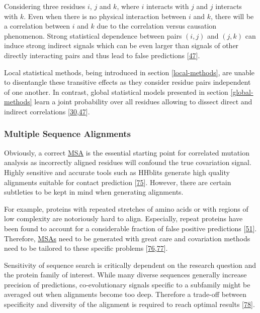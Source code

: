 \documentclass[12pt,a4paper,twoside]{book}
\theoremstyle{definition}
\theoremstyle{definition}
\theoremstyle{remark}
\begin{document}
Considering three residues \(i\), \(j\) and \(k\), where \(i\) interacts
with \(j\) and \(j\) interacts with \(k\). Even when there is no
physical interaction between \(i\) and \(k\), there will be a
correlation between \(i\) and \(k\) due to the correlation versus
causation phenomenon. Strong statistical dependence between pairs
\((i,j)\) and \((j,k)\) can induce strong indirect signals which can be
even larger than signals of other directly interacting pairs and thus
lead to false predictions {[}\protect\hyperlink{ref-Burger2010}{47}{]}.

Local statistical methods, being introduced in section
\ref{local-methods}, are unable to disentangle these transitive effects
as they consider residue pairs independent of one another. In contrast,
global statistical models presented in section \ref{global-methods}
learn a joint probability over all residues allowing to dissect direct
and indirect correlations
{[}\protect\hyperlink{ref-Weigt2009}{30},\protect\hyperlink{ref-Burger2010}{47}{]}.

\subsubsection*{Multiple Sequence
Alignments}\label{multiple-sequence-alignments}

Obviously, a correct \protect\hyperlink{abbrev}{MSA} is the essential
starting point for correlated mutation analysis as incorrectly aligned
residues will confound the true covariation signal. Highly sensitive and
accurate tools such as HHblits generate high quality alignments suitable
for contact prediction {[}\protect\hyperlink{ref-Remmert2012}{75}{]}.
However, there are certain subtleties to be kept in mind when generating
alignments.

For example, proteins with repeated stretches of amino acids or with
regions of low complexity are notoriously hard to align. Especially,
repeat proteins have been found to account for a considerable fraction
of false positive predictions
{[}\protect\hyperlink{ref-Anishchenko2017}{51}{]}. Therefore,
\protect\hyperlink{abbrev}{MSAs} need to be generated with great care
and covariation methods need to be tailored to these specific problems
{[}\protect\hyperlink{ref-Espada2014}{76},\protect\hyperlink{ref-Toth-Petroczy2016}{77}{]}.

Sensitivity of sequence search is critically dependent on the research
question and the protein family of interest. While many diverse
sequences generally increase precision of predictions, co-evolutionary
signals specific to a subfamily might be averaged out when alignments
become too deep. Therefore a trade-off between specificity and diversity
of the alignment is required to reach optimal results
{[}\protect\hyperlink{ref-Hopf2012}{78}{]}.
\end{document}
